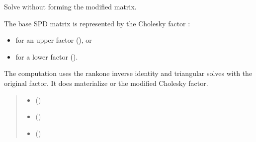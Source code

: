 \documentclass[a4paper,11pt,english]{sphinxmanual}
\begin{document}
\begin{fulllineitems}
\label{\detokenize{generated/cholrot.cholsolve:cholrot.cholsolve}}
\pysigstartsignatures
\pysiglinewithargsret
{}
{\sphinxparamcomma {}\sphinxparamcomma {}\sphinxparamcomma {}\sphinxparamcomma {}\sphinxparamcomma {}\sphinxparamcomma {}}
{}
\pysigstopsignatures
\sphinxAtStartPar
Solve  without forming the modified matrix.

\sphinxAtStartPar
The base SPD matrix  is represented by the Cholesky factor :
\begin{itemize}
\item {} 
\sphinxAtStartPar
{} for an upper factor (), or

\item {} 
\sphinxAtStartPar
{} for a lower factor ().

\end{itemize}

\sphinxAtStartPar
The computation uses the rank\sphinxhyphen{}one inverse identity and triangular solves
with the original factor. It does  materialize  or
the modified Cholesky factor.
\begin{quote}\begin{description}
\begin{itemize}
\item {} 
\sphinxAtStartPar
{} ()

\item {} 
\sphinxAtStartPar
{} ()

\item {} 
\sphinxAtStartPar
{} ()


\end{itemize}
\end{description}
\end{quote}
\end{fulllineitems}
\end{document}
